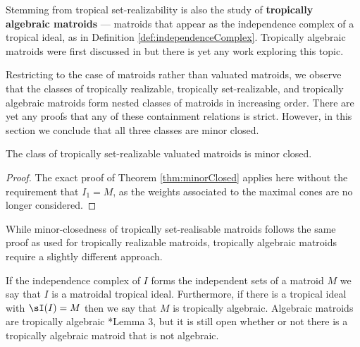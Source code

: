     Stemming from tropical set-realizability is also the study of \textbf{tropically algebraic matroids} --- matroids that appear as the independence complex of a tropical ideal, as in Definition \ref{def:independenceComplex}. Tropically algebraic matroids were first discussed in \cite{DR19} but there is yet any work exploring this topic.
    
    Restricting to the case of matroids rather than valuated matroids, we observe that the classes of tropically realizable, tropically set-realizable, and tropically algebraic matroids form nested classes of matroids in increasing order. There are yet any proofs that any of these containment relations is strict. However, in this section we conclude that all three classes are minor closed.

\begin{proposition}
The class of tropically set-realizable valuated matroids is minor closed.
\end{proposition}
\begin{proof}
The exact proof of Theorem \ref{thm:minorClosed} applies here without the requirement that $I_1=M$, as the weights associated to the maximal cones are no longer considered.
\end{proof}

While minor-closedness of tropically set-realisable matroids follows the same proof as used for tropically realizable matroids, tropically algebraic matroids require a slightly different approach.

If the independence complex of $I$ forms the independent sets of a matroid $M$ we say that $I$ is a matroidal tropical ideal. Furthermore, if there is a tropical ideal with $\sI(I)=M$ then we say that $M$ is tropically algebraic. Algebraic matroids are tropically algebraic \cite{Yu17}*{Lemma 3}, but it is still open whether or not there is a tropically algebraic matroid that is not algebraic.

